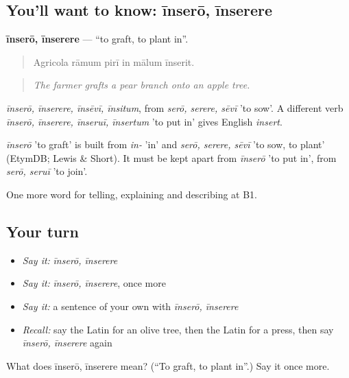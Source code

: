 \subsection*{You'll want to know: īnserō, īnserere}
\textbf{īnserō, īnserere} — \textquotedblleft{}to graft, to plant in\textquotedblright{}.

\begin{quote}
Agricola rāmum pirī in mālum īnserit.
\end{quote}

\begin{quote}
\emph{The farmer grafts a pear branch onto an apple tree.}
\end{quote}

\emph{īnserō, īnserere, īnsēvī, īnsitum}, from \emph{serō, serere, sēvī} 'to sow'. A different verb \emph{īnserō, īnserere, īnseruī, īnsertum} 'to put in' gives English \emph{insert}.

\begin{cousinweb}
\emph{īnserō} 'to graft' is built from \emph{in-} 'in' and \emph{serō, serere, sēvī} 'to sow, to plant' (EtymDB; Lewis \& Short). It must be kept apart from \emph{īnserō} 'to put in', from \emph{serō, seruī} 'to join'.
\end{cousinweb}

\begin{grammarlens}[title={What you've built}]
One more word for telling, explaining and describing at B1.
\end{grammarlens}

\subsection*{Your turn}
\begin{itemize}
\raggedright
  \item \emph{Say it:} \emph{īnserō, īnserere}
  \item \emph{Say it:} \emph{īnserō, īnserere}, once more
  \item \emph{Say it:} a sentence of your own with \emph{īnserō, īnserere}
  \item \emph{Recall:} say the Latin for an olive tree, then the Latin for a press, then say \emph{īnserō, īnserere} again
\end{itemize}

\begin{tcolorbox}[breakable,colback=teal!4,colframe=teal!35!black,title={Before you move on}]
What does īnserō, īnserere mean? (\textquotedblleft{}To graft, to plant in\textquotedblright{}.) Say it once more.
\end{tcolorbox}
